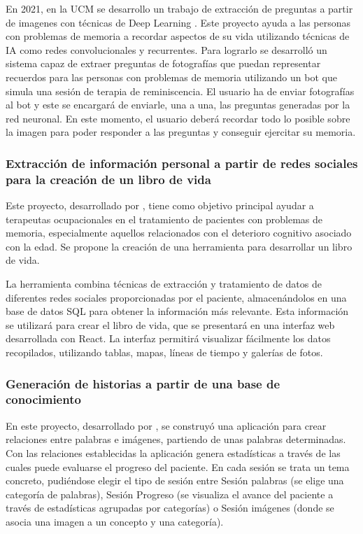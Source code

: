 En 2021, en la UCM se desarrollo un trabajo de extracción de preguntas a partir de imagenes con técnicas de Deep Learning \citep{boto2021extraccion}. Este proyecto ayuda a las personas con problemas de memoria a recordar aspectos de su vida utilizando técnicas de IA como redes convolucionales y recurrentes. Para lograrlo se desarrolló un sistema capaz de extraer preguntas de fotografías que puedan representar recuerdos para las personas con problemas de memoria utilizando un bot que simula una sesión de terapia de reminiscencia.
El usuario ha de enviar fotografías al bot y este se encargará de enviarle, una a una, las preguntas generadas por la red neuronal. En este momento, el usuario deberá recordar todo lo posible sobre la imagen para poder responder a las preguntas y conseguir ejercitar su memoria.

\subsubsection{Extracción de información personal a partir de redes sociales para la creación de un libro de vida}
Este proyecto, desarrollado por \cite{aguilera2021extraccion}, tiene como objetivo principal ayudar a terapeutas ocupacionales en el tratamiento de pacientes con problemas de memoria, especialmente aquellos relacionados con el deterioro cognitivo asociado con la edad. Se propone la creación de una herramienta para desarrollar un libro de vida.

La herramienta combina técnicas de extracción y tratamiento de datos de diferentes redes sociales proporcionadas por el paciente, almacenándolos en una base de datos SQL para obtener la información más relevante. Esta información se utilizará para crear el libro de vida, que se presentará en una interfaz web desarrollada con React. La interfaz permitirá visualizar fácilmente los datos recopilados, utilizando tablas, mapas, líneas de tiempo y galerías de fotos.

\subsubsection{Generación de historias a partir de una base de conocimiento}
En este proyecto, desarrollado por \cite{lucia_latorre_magaz}, se construyó una aplicación para crear relaciones entre palabras e imágenes,
partiendo de unas palabras determinadas. Con las relaciones establecidas la aplicación genera estadísticas a través de las cuales puede evaluarse el progreso del paciente. En cada sesión se trata un tema concreto, pudiéndose elegir el tipo de sesión entre Sesión palabras (se elige una categoría de palabras), Sesión Progreso (se visualiza el avance del paciente a través de estadísticas agrupadas por categorías) o Sesión imágenes (donde se asocia una imagen a un concepto y una categoría).

